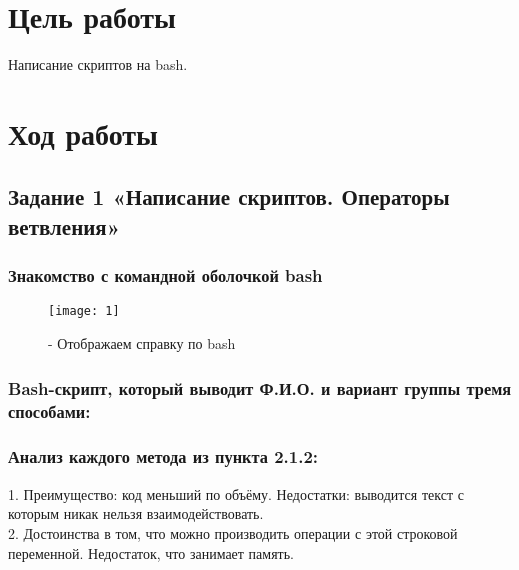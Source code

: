 







\section{Цель работы}
Написание скриптов на bash.

\section{Ход работы}

\subsection{Задание 1 «Написание скриптов. Операторы ветвления»}

\subsubsection{Знакомство с командной оболочкой bash}
	\begin{figure}[H]
		\begin{center}
			\texttt{[image: 1]}
			\caption{- Отображаем справку по bash} 
			\label{pic:pic_1} %
		\end{center}
	\end{figure}

\subsubsection{Bash-скрипт, который выводит Ф.И.О. и вариант группы тремя способами:}
	
	\parindent=1cm

\subsubsection{Анализ каждого метода из пункта 2.1.2:}
1. Преимущество: код меньший по объёму. Недостатки: выводится текст с которым никак нельзя взаимодействовать.\\

2. Достоинства в том, что можно производить операции с этой строковой переменной. Недостаток, что занимает память.\\

